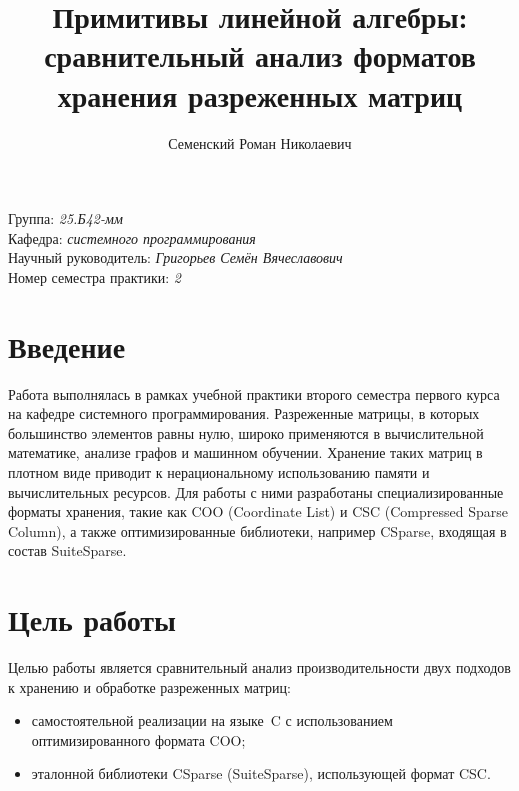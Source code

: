 \documentclass[a4paper]{article}
\title{Примитивы линейной алгебры: сравнительный анализ форматов хранения разреженных матриц}
\author{Семенский Роман Николаевич}
\date{}
\begin{document}
\maketitle

\begin{flushright}
    Группа: \emph{25.Б42-мм} \\
    Кафедра: \emph{системного программирования} \\
    Научный руководитель: \emph{Григорьев Семён Вячеславович} \\
    Номер семестра практики: \emph{2}
\end{flushright}

\section{Введение}
Работа выполнялась в рамках учебной практики второго семестра первого курса на кафедре системного программирования. Разреженные матрицы, в которых большинство элементов равны нулю, широко применяются в вычислительной математике, анализе графов и машинном обучении. Хранение таких матриц в плотном виде приводит к нерациональному использованию памяти и вычислительных ресурсов. Для работы с ними разработаны специализированные форматы хранения, такие как COO (Coordinate List) и CSC (Compressed Sparse Column), а также оптимизированные библиотеки, например CSparse, входящая в состав SuiteSparse.

\section{Цель работы}
Целью работы является сравнительный анализ производительности двух подходов к хранению и обработке разреженных матриц:
\begin{itemize}
    \item самостоятельной реализации на языке~C с использованием оптимизированного формата COO;
    \item эталонной библиотеки CSparse (SuiteSparse), использующей формат CSC.
\end{itemize}
\end{document}
